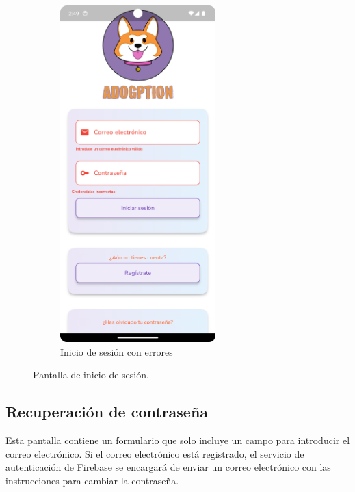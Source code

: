 \documentclass[a4paper, 12pt]{article}
\begin{document}
\begin{figure}[H]
\begin{subfigure}{0.48\textwidth}
\begin{center}
			{\includegraphics[width=6cm]{app/LoginWithErrors.png}\par}
			\caption{Inicio de sesión con errores}
		\end{center}  
	\end{subfigure}\hfill
	\caption{Pantalla de inicio de sesión.}\label{fig:login}
\end{figure}



\newpage
\subsection*{Recuperación de contraseña}

Esta pantalla contiene un formulario que solo incluye un campo para introducir el correo electrónico. Si el correo electrónico está registrado, el servicio de autenticación de Firebase se encargará de enviar un correo electrónico con las instrucciones para cambiar la contraseña.
\end{document}
